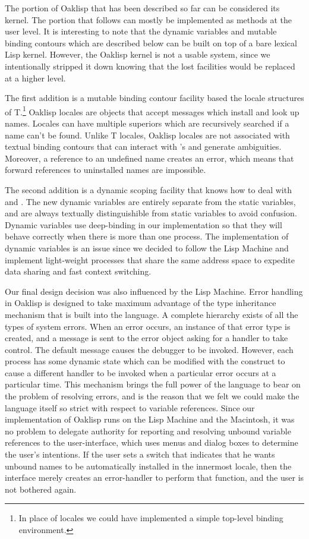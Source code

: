 The portion of Oaklisp that has been described so far can be
considered its kernel.  The portion that follows can mostly be
implemented as methods at the user level.  It is interesting to note
that the dynamic variables and mutable binding contours which are
described below can be built on top of a bare lexical Lisp kernel.
However, the Oaklisp kernel is not a usable system, since we
intentionally stripped it down knowing that the lost facilities would
be replaced at a higher level.

The first addition is a mutable binding contour facility based the
locale structures of T.\footnote{In place of locales we could have
implemented a simple top-level binding environment.} Oaklisp locales
are objects that accept messages which install and look up names.
Locales can have multiple superiors which are recursively searched if
a name can't be found.  Unlike T locales, Oaklisp locales are not
associated with textual binding contours that can interact with
's and generate ambiguities.  Moreover, a reference to an
undefined name creates an error, which means that forward references
to uninstalled names are impossible.

The second addition is a dynamic scoping facility that knows how to
deal with  and .  The new dynamic variables are
entirely separate from the static variables, and are always textually
distinguishible from static variables to avoid confusion.  Dynamic
variables use deep-binding in our implementation so that they will
behave correctly when there is more than one process.  The
implementation of dynamic variables is an issue since we decided to
follow the Lisp Machine and implement light-weight processes that
share the same address space to expedite data sharing and fast context
switching.

Our final design decision was also influenced by the Lisp Machine.
Error handling in Oaklisp is designed to take maximum advantage of the
type inheritance mechanism that is built into the language.  A
complete hierarchy exists of all the types of system errors.  When an
error occurs, an instance of that error type is created, and a message
is sent to the error object asking for a handler to take control.  The
default message causes the debugger to be invoked.  However, each
process has some dynamic state which can be modified with the
 construct to cause a different handler to be
invoked when a particular error occurs at a particular time.  This
mechanism brings the full power of the language to bear on the problem
of resolving errors, and is the reason that we felt we could make the
language itself so strict with respect to variable references.  Since
our implementation of Oaklisp runs on the Lisp Machine and the
Macintosh, it was no problem to delegate authority for reporting and
resolving unbound variable references to the user-interface, which
uses menus and dialog boxes to determine the user's intentions.  If
the user sets a switch that indicates that he wants unbound names to
be automatically installed in the innermost locale, then the interface
merely creates an error-handler to perform that function, and the user
is not bothered again.
